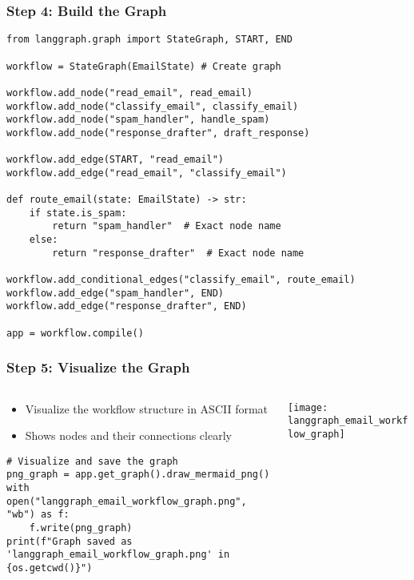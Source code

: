\begin{frame}[fragile]\frametitle{Step 4: Build the Graph}
      \begin{lstlisting}
from langgraph.graph import StateGraph, START, END

workflow = StateGraph(EmailState) # Create graph

workflow.add_node("read_email", read_email)
workflow.add_node("classify_email", classify_email)
workflow.add_node("spam_handler", handle_spam)
workflow.add_node("response_drafter", draft_response)

workflow.add_edge(START, "read_email")
workflow.add_edge("read_email", "classify_email")

def route_email(state: EmailState) -> str:
    if state.is_spam:
        return "spam_handler"  # Exact node name
    else:
        return "response_drafter"  # Exact node name

workflow.add_conditional_edges("classify_email", route_email)
workflow.add_edge("spam_handler", END)
workflow.add_edge("response_drafter", END)

app = workflow.compile()
      \end{lstlisting}
\end{frame}

\begin{frame}[fragile]\frametitle{Step 5: Visualize the Graph}

\begin{columns}
    \begin{column}[T]{0.7\linewidth}
      \begin{itemize}
        \item Visualize the workflow structure in ASCII format
        \item Shows nodes and their connections clearly
      \end{itemize}
	  
      \begin{lstlisting}
# Visualize and save the graph
png_graph = app.get_graph().draw_mermaid_png()
with open("langgraph_email_workflow_graph.png", "wb") as f:
    f.write(png_graph)
print(f"Graph saved as 'langgraph_email_workflow_graph.png' in {os.getcwd()}")       
      \end{lstlisting}
	  


    \end{column}
    \begin{column}[T]{0.3\linewidth}
\begin{center}
\texttt{[image: langgraph\_email\_workflow\_graph]}

\end{center}
    \end{column}
  \end{columns}
  

	  


\end{frame}

